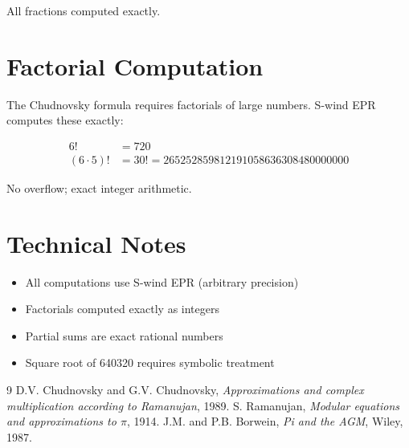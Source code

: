 \documentclass[11pt,a4paper]{article}
\begin{document}
All fractions computed exactly.

\section{Factorial Computation}

The Chudnovsky formula requires factorials of large numbers. S-wind EPR computes these exactly:

\begin{align}
6! &= 720 \\
(6 \cdot 5)! &= 30! = 265252859812191058636308480000000
\end{align}

No overflow; exact integer arithmetic.

\section{Technical Notes}

\begin{itemize}
    \item All computations use S-wind EPR (arbitrary precision)
    \item Factorials computed exactly as integers
    \item Partial sums are exact rational numbers
    \item Square root of 640320 requires symbolic treatment
\end{itemize}

\begin{thebibliography}{9}
 D.V. Chudnovsky and G.V. Chudnovsky, \textit{Approximations and complex multiplication according to Ramanujan}, 1989.
 S. Ramanujan, \textit{Modular equations and approximations to $\pi$}, 1914.
 J.M. and P.B. Borwein, \textit{Pi and the AGM}, Wiley, 1987.
\end{thebibliography}
\end{document}

